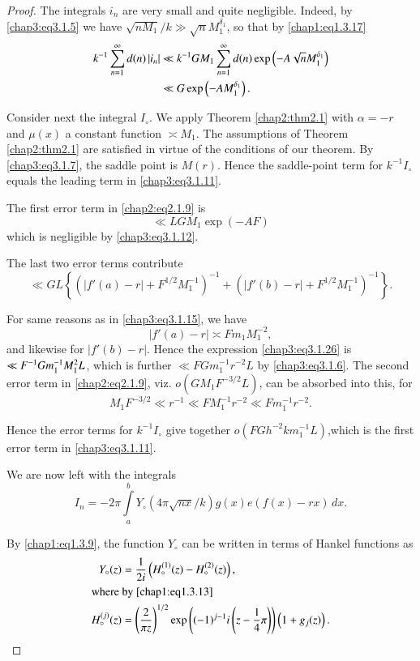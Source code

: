 \begin{proof}
The integrals $i_n$ are very small and quite negligible. Indeed, by
\eqref{chap3:eq3.1.5} we have
$\sqrt{nM_1}/k\gg\sqrt{n}M_1^{\delta_1}$, so that by
\eqref{chap1:eq1.3.17}
\begin{align}
k^{-1}\sum\limits_{n=1}^\infty d(n)\left|i_n\right|& \ll k^{-1}GM_1
\sum\limits_{n=1}^\infty d(n)\exp\left(-A\sqrt{n}M_1^{\delta_1}
\right)\label{chap3:3.1.25}\\
&\ll G\exp\left(-AM_1^{\delta_1}\right).\notag
\end{align}

Consider next the integral $I_\circ$. We apply Theorem
\ref{chap2:thm2.1} with $\alpha = -r$ and $\mu(x)$ a constant function
$\asymp M_1$. The assumptions of Theorem \ref{chap2:thm2.1} are
satisfied in virtue of the conditions of our theorem. By
\eqref{chap3:eq3.1.7}, the saddle point is $M(r)$. Hence the
saddle-point term for $k^{-1}I_\circ$ equals the leading term in
\eqref{chap3:eq3.1.11}. 

The first error term in \eqref{chap2:eq2.1.9} is 
$$
\ll LGM_1\exp(-AF)
$$
which is negligible by \eqref{chap3:eq3.1.12}.

The last two error terms contribute
\begin{equation}\label{chap3:eq3.1.26}
\ll GL\left\{\left(\left|f'(a)-r\right|+F^{1/2}M_1^{-1}\right)^{-1}
+\left( \left|f'(b)-r\right|+F^{1/2}M_1^{-1}\right)^{-1}\right\}.
\end{equation}

For same reasons as in \eqref{chap3:eq3.1.15}, we have 
$$
\left|f'(a)-r\right|\asymp Fm_1M_1^{-2},
$$
and likewise for $|f'(b)-r|$. Hence the expression
\eqref{chap3:eq3.1.26} is $\ll F^{-1}\break Gm_1^{-1}M_1^2L$,\pageoriginale
which is further $\ll FGm_1^{-1}r^{-2}L$ by \eqref{chap3:eq3.1.6}. The
second error term in \eqref{chap2:eq2.1.9}, viz. $o(GM_1F^{-3/2}L)$, can
be absorbed into this, for 
$$
M_1F^{-3/2}\ll r^{-1}\ll FM_1^{-1}r^{-2}\ll Fm_1^{-1}r^{-2}.
$$

Hence the error terms for $k^{-1}I_\circ$ give together
$o(FGh^{-2}km_1^{-1}L)$,\break which is the first error term in
\eqref{chap3:eq3.1.11}. 

We are now left with the integrals 
\begin{equation}\label{chap3:eq3.1.27}
I_n=-2\pi\int\limits_a^bY_\circ\left(4\pi\sqrt{nx}/k\right)g(x)e(f(x)-rx)
\,dx. 
\end{equation}

By \eqref{chap1:eq1.3.9}, the function $Y_\circ$ can be written in
terms of Hankel functions as 
\begin{align}
Y_\circ(z) &= \frac{1}{2i}\left(H_\circ^{(1)}(z)-H_\circ^{(2)}(z)
\right),\label{chap3:eq3.1.28}\\
\intertext{where by \eqref{chap1:eq1.3.13}}
H_\circ^{(j)}(z) &= \left(\frac{2}{\pi z}\right)^{1/2}\exp\left(
(-1)^{j-1}i\left(z-\frac{1}{4}\pi\right)\right)\left(
1+g_j(z)\right).\label{chap3:eq3.1.29}
\end{align}


\end{proof}
